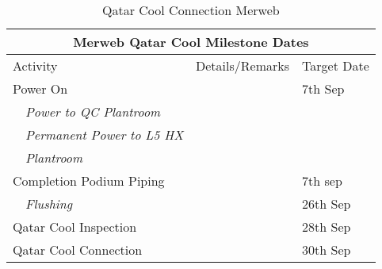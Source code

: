 \begin{table}[htbp]
\small
\begin{tabular}{p{4.3cm}p{3.5cm}l }
\toprule
\multicolumn{3}{c}{{Merweb Qatar Cool  Milestone Dates}}\\
\midrule
Activity	                                       &Details/Remarks	&Target Date                \\
\midrule
Power On		                           &      			& 7th Sep      \\
~~\em{Power to QC Plantroom}	   &                              &                           \\	
~~\em{Permanent Power to L5 HX}     &                               &                           \\
~~\em{Plantroom}		               &                              &                           \\
Completion Podium Piping	               &		           & 7th sep    \\
~~\em{Flushing}                                   &                              & 26th Sep      \\
Qatar Cool Inspection 	               &      		           &28th Sep\\
Qatar Cool Connection	               &		           &30th Sep\\
 \bottomrule
\end{tabular}
\caption{Qatar Cool Connection Merweb}
\end{table} 

















